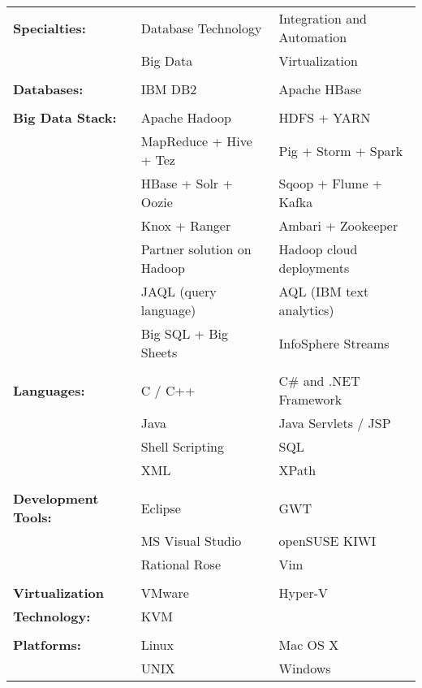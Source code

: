 \documentclass[margin,line]{resume}
\begin{document}
\begin{resume}
\begin{tabular}{@{}p{1.75in}p{1.75in}p{1.75in}}
\textbf{Specialties:}		&	Database Technology	&	Integration and Automation	\\
				&	Big Data		&	Virtualization			\\
\\
\textbf{Databases:}		&	IBM DB2			&	Apache HBase			\\
\\
\textbf{Big Data Stack:}	&	Apache Hadoop		&	HDFS + YARN			\\
				&	MapReduce + Hive + Tez	&	Pig + Storm + Spark		\\
				&	HBase + Solr + Oozie	&	Sqoop + Flume + Kafka		\\
				&	Knox + Ranger		&	Ambari + Zookeeper		\\
				&	Partner solution on Hadoop	&	Hadoop cloud deployments\\
				&	JAQL (query language)	&	AQL (IBM text analytics)	\\
                                &       Big SQL + Big Sheets	&	InfoSphere Streams		\\
\\
\textbf{Languages:}		&	C / C++			&	C\# and .NET Framework		\\
				&	Java			&	Java Servlets / JSP		\\
				&	Shell Scripting		&	SQL				\\
				&	XML			&	XPath				\\
\\
\textbf{Development Tools:}	&	Eclipse			&	GWT				\\
				&	MS Visual Studio	&	openSUSE KIWI			\\
				&	Rational Rose		&	Vim				\\
\\
\textbf{Virtualization }	&	VMware			&	Hyper-V				\\
\textbf{Technology:}		&	KVM			&					\\
\\
\textbf{Platforms:}		&	Linux			&	Mac OS X			\\
				&	UNIX			&	Windows				\\

\end{tabular}

%

\end{resume}
\end{document}
